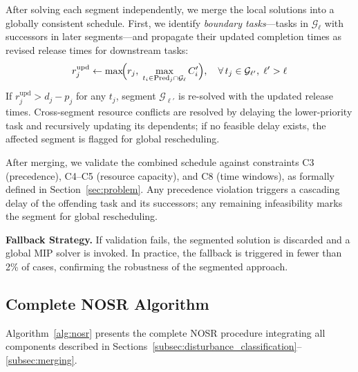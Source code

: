 \documentclass[manuscript,screen,review]{acmart}
\begin{document}
After solving each segment independently, we merge the local solutions into a
globally consistent schedule. First, we identify \emph{boundary tasks}---tasks
in $\mathcal{G}_\ell$ with successors in later segments---and propagate their
updated completion times as revised release times for downstream tasks:
\begin{equation}
    r_j^{\mathrm{upd}} \gets \max\!\Bigl(r_j,\;
    \max_{t_i \in \mathrm{Pred}_j \cap \mathcal{G}_\ell} C_i'\Bigr),
    \quad \forall\, t_j \in \mathcal{G}_{\ell'},\; \ell' > \ell
    \label{eq:update_release}
\end{equation}
If $r_j^{\mathrm{upd}} > d_j - p_j$ for any $t_j$, segment
$\mathcal{G}_{\ell'}$ is re-solved with the updated release times.
Cross-segment resource conflicts are resolved by delaying the lower-priority
task and recursively updating its dependents; if no feasible delay exists,
the affected segment is flagged for global rescheduling.

After merging, we validate the combined schedule against constraints C3
(precedence), C4--C5 (resource capacity), and C8 (time windows), as formally
defined in Section~\ref{sec:problem}. Any precedence violation triggers a
cascading delay of the offending task and its successors; any remaining
infeasibility marks the segment for global rescheduling.

\textbf{Fallback Strategy.}
If validation fails, the segmented solution is discarded and a global MIP solver is invoked. In practice, the fallback is triggered in fewer
than 2\% of cases, confirming the robustness of the segmented approach.

\subsection{Complete NOSR Algorithm}
\label{subsec:nosr_algorithm}

Algorithm~\ref{alg:nosr} presents the complete NOSR procedure integrating all
components described in
Sections~\ref{subsec:disturbance_classification}--\ref{subsec:merging}.
\end{document}
